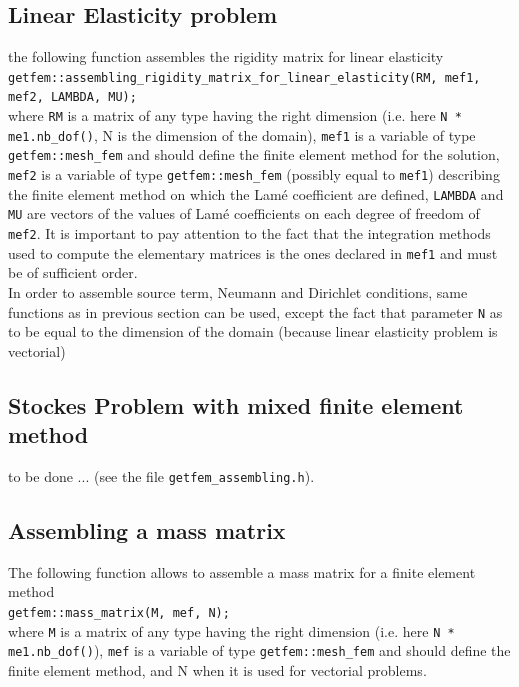\documentclass[11pt,a4paper]{article}
\begin{document}
\subsection{Linear Elasticity problem}

the following function assembles the rigidity matrix for linear elasticity\\[0.5cm]
{\tt getfem::assembling\_rigidity\_matrix\_for\_linear\_elasticity(RM, mef1, mef2, LAMBDA, MU); } \\[0.5cm]
where {\tt RM} is a matrix of any type having the right dimension (i.e. here {\tt N * me1.nb\_dof()}, N is the dimension of the domain), {\tt mef1} is a variable of type {\tt getfem::mesh\_fem} and should define the finite element method for the solution, {\tt mef2}  is a variable of type {\tt getfem::mesh\_fem} (possibly equal to {\tt mef1}) describing the finite element method on which the Lam{\'e} coefficient are defined, {\tt LAMBDA} and {\tt MU} are vectors of the values of Lam{\'e} coefficients on each degree of freedom of {\tt mef2}. It is important to pay attention to the fact that the integration methods used to compute the elementary matrices is the ones declared in {\tt mef1} and must be of sufficient order.\\[0.5cm]

In order to assemble source term, Neumann and Dirichlet conditions, same functions as in previous section can be used, except the fact that parameter {\tt N} as to be equal to the dimension of the domain (because linear elasticity problem is vectorial)

\subsection{Stockes Problem with mixed finite element method}

to be done ... (see the file {\tt getfem\_assembling.h}).
 
\subsection{Assembling a mass matrix}

The following function allows to assemble a mass matrix for a finite element method\\[0.5cm]
{\tt getfem::mass\_matrix(M, mef, N); } \\[0.5cm]
where {\tt M} is a matrix of any type having the right dimension (i.e. here {\tt N * me1.nb\_dof()}), {\tt mef} is a variable of type {\tt getfem::mesh\_fem} and should define the finite element method, and N when it is used for vectorial problems.
\end{document}
